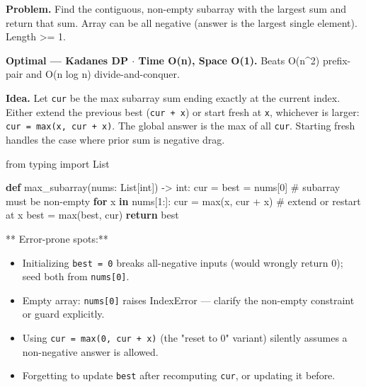 \documentclass[11pt]{article}
\providecommand{\tightlist}{\setlength{\itemsep}{1pt}\setlength{\parskip}{0pt}}
\newenvironment{Shaded}{\begin{snugshade}}{\end{snugshade}}
\newcommand{\BuiltInTok}[1]{\textcolor[rgb]{0.50,0.55,0.55}{#1}}
\newcommand{\CommentTok}[1]{\textcolor[rgb]{0.48,0.49,0.49}{#1}}
\newcommand{\ControlFlowTok}[1]{\textcolor[rgb]{0.99,0.74,0.29}{\textbf{#1}}}
\newcommand{\DecValTok}[1]{\textcolor[rgb]{0.96,0.45,0.00}{#1}}
\newcommand{\ImportTok}[1]{\textcolor[rgb]{0.15,0.68,0.38}{#1}}
\newcommand{\KeywordTok}[1]{\textcolor[rgb]{0.81,0.81,0.76}{\textbf{#1}}}
\newcommand{\NormalTok}[1]{\textcolor[rgb]{0.81,0.81,0.76}{#1}}
\newcommand{\OperatorTok}[1]{\textcolor[rgb]{0.81,0.81,0.76}{#1}}
\begin{document}
\textbf{Problem.} Find the contiguous, non-empty subarray with the largest sum and return that sum. Array can be all negative (answer is the largest single element). Length \textgreater= 1.

\textbf{Optimal --- Kadane\textquotesingle s DP \(\cdot\) Time O(n), Space O(1).} Beats O(n\^{}2) prefix-pair and O(n log n) divide-and-conquer.

\textbf{Idea.} Let \texttt{cur} be the max subarray sum ending exactly at the current index. Either extend the previous best (\texttt{cur\ +\ x}) or start fresh at \texttt{x}, whichever is larger: \texttt{cur\ =\ max(x,\ cur\ +\ x)}. The global answer is the max of all \texttt{cur}. Starting fresh handles the case where prior sum is negative drag.


\begin{Shaded}
\begin{Highlighting}[]
\ImportTok{from}\NormalTok{ typing }\ImportTok{import}\NormalTok{ List}

\KeywordTok{def}\NormalTok{ max\_subarray(nums: List[}\BuiltInTok{int}\NormalTok{]) }\OperatorTok{{-}\textgreater{}} \BuiltInTok{int}\NormalTok{:}
\NormalTok{    cur }\OperatorTok{=}\NormalTok{ best }\OperatorTok{=}\NormalTok{ nums[}\DecValTok{0}\NormalTok{]          }\CommentTok{\# subarray must be non{-}empty}
    \ControlFlowTok{for}\NormalTok{ x }\KeywordTok{in}\NormalTok{ nums[}\DecValTok{1}\NormalTok{:]:}
\NormalTok{        cur }\OperatorTok{=} \BuiltInTok{max}\NormalTok{(x, cur }\OperatorTok{+}\NormalTok{ x)     }\CommentTok{\# extend or restart at x}
\NormalTok{        best }\OperatorTok{=} \BuiltInTok{max}\NormalTok{(best, cur)}
    \ControlFlowTok{return}\NormalTok{ best}
\end{Highlighting}
\end{Shaded}

** Error-prone spots:**

\begin{itemize}
\tightlist
\item
  Initializing \texttt{best\ =\ 0} breaks all-negative inputs (would wrongly return 0); seed both from \texttt{nums{[}0{]}}.
\item
  Empty array: \texttt{nums{[}0{]}} raises IndexError --- clarify the non-empty constraint or guard explicitly.
\item
  Using \texttt{cur\ =\ max(0,\ cur\ +\ x)} (the "reset to 0" variant) silently assumes a non-negative answer is allowed.
\item
  Forgetting to update \texttt{best} after recomputing \texttt{cur}, or updating it before.
\end{itemize}
\end{document}
